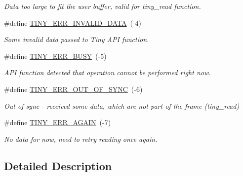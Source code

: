\begin{DoxyCompactItemize}
\begin{DoxyCompactList}\small\item\em Data too large to fit the user buffer, valid for tiny\+\_\+read function. \end{DoxyCompactList}\item 
\mbox{\label{group__ERROR__FLAGS_ga541a9e67a84e39595ad647d641c4df2e}} 
\#define \hyperlink{group__ERROR__FLAGS_ga541a9e67a84e39595ad647d641c4df2e}{T\+I\+N\+Y\+\_\+\+E\+R\+R\+\_\+\+I\+N\+V\+A\+L\+I\+D\+\_\+\+D\+A\+TA}~(-\/4)
\begin{DoxyCompactList}\small\item\em Some invalid data passed to Tiny A\+PI function. \end{DoxyCompactList}\item 
\mbox{\label{group__ERROR__FLAGS_ga9b3e170e1c6ce269f216ef4a1ac61995}} 
\#define \hyperlink{group__ERROR__FLAGS_ga9b3e170e1c6ce269f216ef4a1ac61995}{T\+I\+N\+Y\+\_\+\+E\+R\+R\+\_\+\+B\+U\+SY}~(-\/5)
\begin{DoxyCompactList}\small\item\em A\+PI function detected that operation cannot be performed right now. \end{DoxyCompactList}\item 
\mbox{\label{group__ERROR__FLAGS_gae1949de45d9c478830dad9c9b996193a}} 
\#define \hyperlink{group__ERROR__FLAGS_gae1949de45d9c478830dad9c9b996193a}{T\+I\+N\+Y\+\_\+\+E\+R\+R\+\_\+\+O\+U\+T\+\_\+\+O\+F\+\_\+\+S\+Y\+NC}~(-\/6)
\begin{DoxyCompactList}\small\item\em Out of sync -\/ received some data, which are not part of the frame (tiny\+\_\+read) \end{DoxyCompactList}\item 
\mbox{\label{group__ERROR__FLAGS_gab15347e8e9f90d709d94d9c151d505b7}} 
\#define \hyperlink{group__ERROR__FLAGS_gab15347e8e9f90d709d94d9c151d505b7}{T\+I\+N\+Y\+\_\+\+E\+R\+R\+\_\+\+A\+G\+A\+IN}~(-\/7)
\begin{DoxyCompactList}\small\item\em No data for now, need to retry reading once again. \end{DoxyCompactList}\end{DoxyCompactItemize}


\subsection{Detailed Description}
